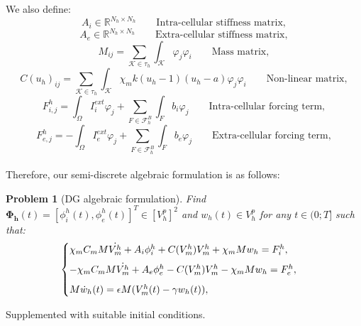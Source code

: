 \documentclass[a4paper,11pt]{article}
\newtheorem{problem}{Problem}
\begin{document}
We also define:
\begin{equation*}
A_i \in \mathbb{R}^{N_h \times N_h} \qquad{\text{Intra-cellular stiffness matrix}},
\end{equation*}
\begin{equation*}
A_e \in \mathbb{R}^{N_h \times N_h} \qquad{\text{Extra-cellular stiffness matrix}},
\end{equation*}
\begin{equation*}
M_{ij} = \sum_{\mathcal{K} \in \tau_h}\int_{\mathcal{K}}\varphi_j\varphi_i \qquad{\text{Mass matrix}},
\end{equation*}
\begin{equation*}
C(u_h)_{ij} =  \sum_{\mathcal{K} \in \tau_h} \int_{\mathcal{K}} \chi_m k(u_h-1)(u_h-a)\varphi_j\varphi_i \qquad{\text{Non-linear matrix}},
\end{equation*}
\begin{equation*}
F^h_{i,j}= \int_{\Omega} I_i^{ext}\varphi_j + \sum_{F \in \mathcal{F}_h^B} \int_F b_i\varphi_j  \qquad{\text{Intra-cellular forcing term}},
\end{equation*}
\begin{equation*}
F^h_{e,j}= - \int_{\Omega} I_e^{ext}\varphi_j + \sum_{F \in \mathcal{F}_h^B} \int_F b_e\varphi_j \qquad{\text{Extra-cellular forcing term}},
\end{equation*}
\vspace{3mm} \\
Therefore, our semi-discrete algebraic formulation is as follows: \vspace{3mm}
\begin{problem}[DG algebraic formulation]\label{algebraic}
Find $\bm{\Phi_h}(t)=[\phi_i^h(t),\phi_e^h(t)]^T \in [V_h^p]^2$ and $w_h(t) \in V_h^p$ for any $t \in (0;T]$ such that:
\begin{equation*}
\begin{cases}
\chi_m C_m M \dot{V_m^h}+A_i \phi_i^h+C(V_m^h) V_m^h+\chi_m M w_h=F_i^h, \vspace{2mm} \\ 
-\chi_m C_m M \dot{V_m^h}+A_e \phi_e^h-C(V_m^h) V_m^h-\chi_m M w_h=F_e^h, \vspace{2mm} \\ 
M \dot{w}_h(t)=\epsilon M (V_m^h(t)-\gamma w_h(t)),
\end{cases}
\end{equation*}
\end{problem}
 \vspace{5mm}
 \noindent Supplemented with suitable initial conditions.\\
\end{document}
